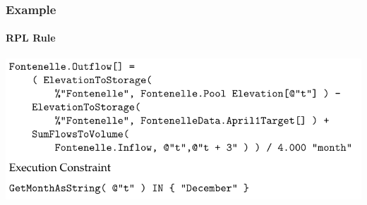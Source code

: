 \documentclass{beamer}
\begin{document}
\begin{frame}
\frametitle{Example}
\framesubtitle{RPL Rule}

\includegraphics[width=\textwidth]{rpl.pdf}



 
 \end{frame}

\end{document}
